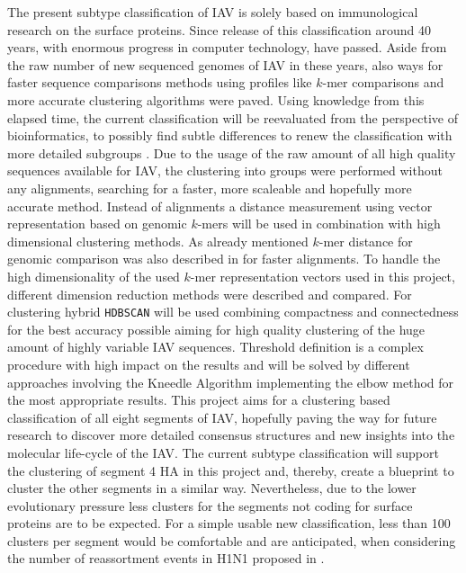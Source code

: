 The present subtype classification of \gls{IAV} is solely based on immunological research on the surface proteins. Since release of this classification around 40 years, with enormous progress in computer technology, have passed. Aside from the raw number of new sequenced genomes of \gls{IAV} in these years, also ways for faster sequence comparisons methods using profiles like $k$-mer comparisons and more accurate clustering algorithms were paved. Using knowledge from this elapsed time, the current classification will be reevaluated from the perspective of bioinformatics, to possibly find subtle differences to renew the classification with more detailed subgroups \autocite{noauthor_revision_1980}. Due to the usage of the raw amount of all high quality sequences available for \gls{IAV}, the clustering into groups were performed without any alignments, searching for a faster, more scaleable and hopefully more accurate method. Instead of alignments a distance measurement using vector representation based on genomic $k$-mers will be used in combination with high dimensional clustering methods. As already mentioned $k$-mer distance for genomic comparison was also described in \textcite{edgar_muscle_2004} for faster alignments. To handle the high dimensionality of the used $k$-mer representation vectors used in this project, different dimension reduction methods were described and compared. For clustering hybrid \texttt{HDBSCAN} will be used combining compactness and connectedness for the best accuracy possible aiming for high quality clustering of the huge amount of highly variable \gls{IAV} sequences. Threshold definition is a complex procedure with high impact on the results and will be solved by different approaches involving the Kneedle Algorithm implementing the elbow method for the most appropriate results. This project aims for a clustering based classification of all eight segments of \gls{IAV}, hopefully paving the way for future research to discover more detailed consensus structures and new insights into the molecular life-cycle of the \gls{IAV}. The current subtype classification will support the clustering of segment 4 \gls{HA} in this project and, thereby, create a blueprint to cluster the other segments in a similar way. Nevertheless, due to the lower evolutionary pressure less clusters for the segments not coding for surface proteins are to be expected. For a simple usable new classification, less than 100 clusters per segment would be comfortable and are anticipated, when considering the number of reassortment events in H1N1 proposed in \textcite{nelson_multiple_2008}. 

